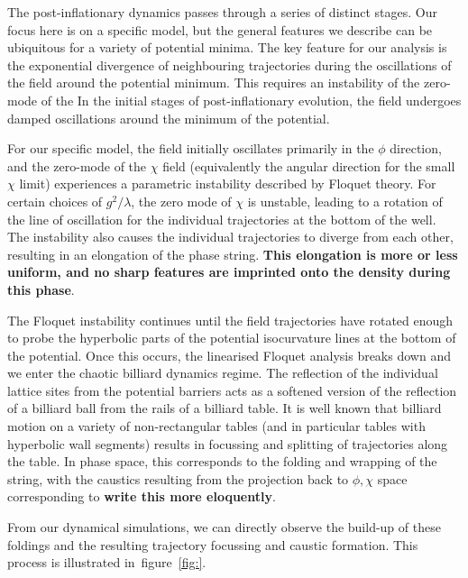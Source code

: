 \documentclass[11pt,a4paper]{article}
\newcommand{\figref}[1]{figure~\ref{#1}}
\begin{document}
The post-inflationary dynamics passes through a series of distinct stages.
Our focus here is on a specific model, but the general features we describe can be ubiquitous for a variety of potential minima.
The key feature for our analysis is the exponential divergence of neighbouring trajectories during the oscillations of the field around the potential minimum.
This requires an instability of the zero-mode of the 
In the initial stages of post-inflationary evolution, the field undergoes damped oscillations around the minimum of the potential.

For our specific model, the field initially oscillates primarily in the $\phi$ direction, and the zero-mode of the $\chi$ field (equivalently the angular direction for the small $\chi$ limit) experiences a parametric instability described by Floquet theory.
For certain choices of $g^2/\lambda$, the zero mode of $\chi$ is unstable, leading to a rotation of the line of oscillation for the individual trajectories at the bottom of the well.
The instability also causes the individual trajectories to diverge from each other, resulting in an elongation of the phase string.
{\bf This elongation is more or less uniform, and no sharp features are imprinted onto the density during this phase}.

The Floquet instability continues until the field trajectories have rotated enough to probe the hyperbolic parts of the potential isocurvature lines at the bottom of the potential.
Once this occurs, the linearised Floquet analysis breaks down and we enter the chaotic billiard dynamics regime.
The reflection of the individual lattice sites from the potential barriers acts as a softened version of the reflection of a billiard ball from the rails of a billiard table.
It is well known that billiard motion on a variety of non-rectangular tables (and in particular tables with hyperbolic wall segments) results in focussing and splitting of trajectories along the table.
In phase space, this corresponds to the folding and wrapping of the string, with the caustics resulting from the projection back to $\phi,\chi$ space corresponding to {\bf write this more eloquently}.

From our dynamical simulations, we can directly observe the build-up of these foldings and the resulting trajectory focussing and caustic formation.
This process is illustrated in~\figref{fig:}.
\end{document}
